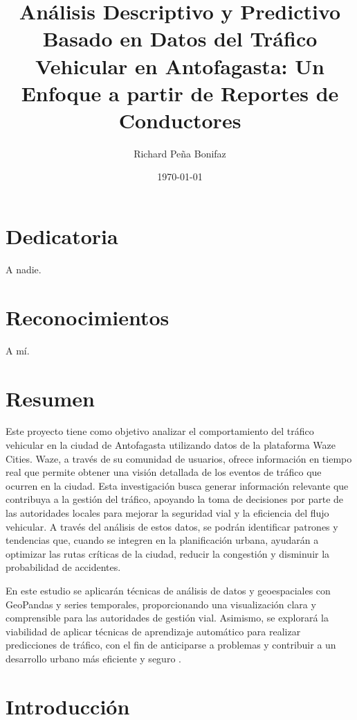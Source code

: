 \documentclass[12pt]{article}
\begin{document}
\title{Análisis Descriptivo y Predictivo Basado en Datos del Tráfico Vehicular en Antofagasta: Un Enfoque a partir de Reportes de Conductores}
\author{Richard Peña Bonifaz}
\date{\today}
\maketitle

\section*{Dedicatoria}
A nadie.
\section*{Reconocimientos}
A mí.

\section*{Resumen}

Este proyecto tiene como objetivo analizar el comportamiento del tráfico vehicular en la ciudad de Antofagasta utilizando datos de la plataforma Waze Cities. Waze, a través de su comunidad de usuarios, ofrece información en tiempo real que permite obtener una visión detallada de los eventos de tráfico que ocurren en la ciudad. Esta investigación busca generar información relevante que contribuya a la gestión del tráfico, apoyando la toma de decisiones por parte de las autoridades locales para mejorar la seguridad vial y la eficiencia del flujo vehicular. A través del análisis de estos datos, se podrán identificar patrones y tendencias que, cuando se integren en la planificación urbana, ayudarán a optimizar las rutas críticas de la ciudad, reducir la congestión y disminuir la probabilidad de accidentes.

En este estudio se aplicarán técnicas de análisis de datos y geoespaciales con GeoPandas y series temporales, proporcionando una visualización clara y comprensible para las autoridades de gestión vial. Asimismo, se explorará la viabilidad de aplicar técnicas de aprendizaje automático para realizar predicciones de tráfico, con el fin de anticiparse a problemas y contribuir a un desarrollo urbano más eficiente y seguro \parencite{barcelo2005}.

\section{Introducción}
\end{document}
